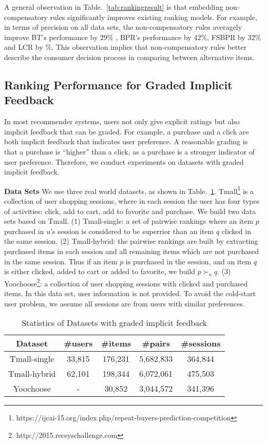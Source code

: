 \documentclass[letterpaper]{article} %
\begin{document}
A general observation in Table.~\ref{tab:rankingresult} is that embedding non-compensatory rules significantly improves existing ranking models. For example, in terms of precision on all data sets, the non-compensatory rules averagely improve BT's performance by $29\%$ , BPR's performance by $42\%$, FSBPR by $32\%$ and LCR by $\%$. This observation implies that non-compensatory rules better describe the consumer decision process in comparing between alternative items.


\subsection{Ranking Performance for Graded Implicit Feedback}
In most recommender systems, users not only give explicit ratings but also implicit feedback that can be graded. For example, a purchase and a click are both implicit feedback that indicates user preference. A reasonable grading is that a purchase is ``higher'' than a click, as a purchase is a stronger indicator of user preference. Therefore, we conduct experiments on datasets with graded implicit feedback.  


\textbf{Data Sets}  We use three real world datasets, as shown in Table.~\ref{tab:idata}. Tmall\footnote{https://ijcai-15.org/index.php/repeat-buyers-prediction-competition} is a collection of user shopping sessions, where in each session the user has four types of activities: click, add to cart, add to favorite and purchase. We build two data sets based on Tmall. (1) Tmall-single: a set of pairwise rankings where an item $p$ purchased in $u$'s session is considered to be superrior than an item $q$ clicked in the same session. (2) Tmall-hybrid: the pairwise rankings are built by extracting purchased items in each session and all remaining items which are not purchased in the same session. Thus if an item $p$ is purchased in the session, and an item $q$ is either clicked, added to cart or added to favorite, we build $p\succ_u q$. (3) Yoochoose\footnote{http://2015.recsyschallenge.com}: a collection of user shopping sessions with clicked and purchased items. In this data set, user information is not provided. To avoid the cold-start user problem, we assume all sessions are from users with similar preferences.
\begin{table}[htp]
\tiny
\caption{Statistics of Datasets with graded implicit feedback}
\begin{center}
\begin{tabular}{|c|c|c|c|c|}
\hline
Dataset & \#users & \#items & \#pairs & \#sessions \\\hline
Tmall-single &33,815 &176,231 &5,682,833 &364,844 \\\hline
Tmall-hybrid &62,101 &198,344 &6,072,061 &475,503 \\\hline
Yoochoose &- &30,852 &3,044,572 &341,396 \\\hline
\end{tabular}
\end{center}
\label{tab:idata}
\end{table}%
\end{document}
